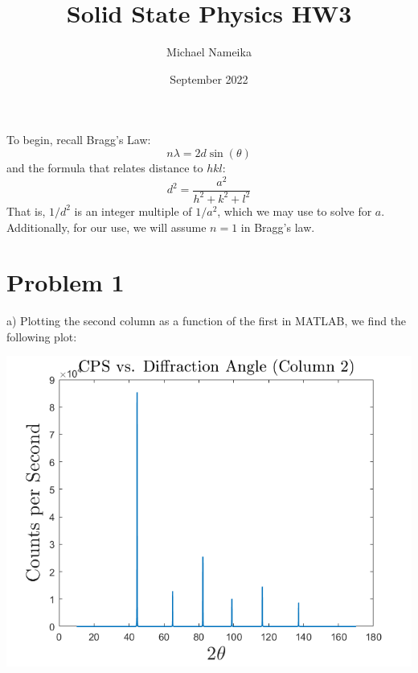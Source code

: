 \documentclass{article}
\title{Solid State Physics HW3}
\author{Michael Nameika}
\date{September 2022}
\begin{document}
\maketitle
To begin, recall Bragg's Law:
\begin{equation}
    n\lambda = 2d\sin{(\theta)}
\end{equation}
and the formula that relates distance to $hkl$:
\begin{equation} 
    d^2 = \frac{a^2}{h^2 + k^2 + l^2}
\end{equation}
That is, $1/d^2$ is an integer multiple of $1/a^2$, which we may use to solve for $a$. Additionally, for our use, we will assume $n = 1$ in Bragg's law.
\section*{Problem 1}
a) Plotting the second column as a function of the first in MATLAB, we find the following plot:
\begin{center}
    \includegraphics[scale = 0.75]{column2.png}
\end{center}
\end{document}

